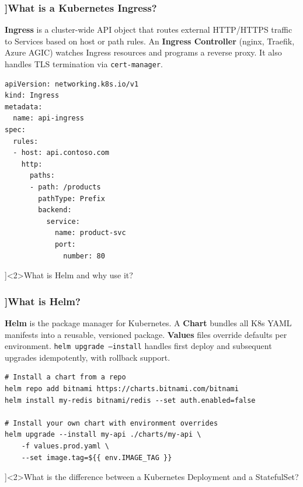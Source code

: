 \begin{frame}[fragile]
  \frametitle{\AnswerTitle[\CategoryBadge[DockerColor!20]{Docker \& K8s}]{What is a Kubernetes Ingress?}}

  {\footnotesize
  \textbf{Ingress} is a cluster-wide API object that routes external HTTP/HTTPS traffic to Services based on host or path rules. An \textbf{Ingress Controller} (nginx, Traefik, Azure AGIC) watches Ingress resources and programs a reverse proxy. It also handles TLS termination via \texttt{cert-manager}.
  }

  \begin{verbatim}
apiVersion: networking.k8s.io/v1
kind: Ingress
metadata:
  name: api-ingress
spec:
  rules:
  - host: api.contoso.com
    http:
      paths:
      - path: /products
        pathType: Prefix
        backend:
          service:
            name: product-svc
            port:
              number: 80
  \end{verbatim}
\end{frame}

\QuestionSlide[\CategoryBadge[DockerColor!20]{Docker \& K8s}]<2>{What is Helm and why use it?}

\begin{frame}[fragile]
  \frametitle{\AnswerTitle[\CategoryBadge[DockerColor!20]{Docker \& K8s}]{What is Helm?}}

  {\footnotesize
  \textbf{Helm} is the package manager for Kubernetes. A \textbf{Chart} bundles all K8s YAML manifests into a reusable, versioned package. \textbf{Values} files override defaults per environment. \texttt{helm upgrade --install} handles first deploy and subsequent upgrades idempotently, with rollback support.
  }

  \begin{verbatim}
# Install a chart from a repo
helm repo add bitnami https://charts.bitnami.com/bitnami
helm install my-redis bitnami/redis --set auth.enabled=false

# Install your own chart with environment overrides
helm upgrade --install my-api ./charts/my-api \
    -f values.prod.yaml \
    --set image.tag=${{ env.IMAGE_TAG }}
  \end{verbatim}
\end{frame}

\QuestionSlide[\CategoryBadge[DockerColor!20]{Docker \& K8s}]<2>{What is the difference between a Kubernetes Deployment and a StatefulSet?}

